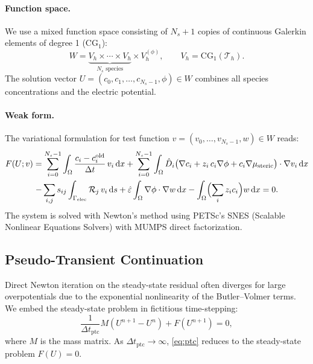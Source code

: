 \documentclass[11pt,a4paper]{article}
\newcommand{\dd}{\mathrm{d}}
\begin{document}
\paragraph{Function space.}
We use a mixed function space consisting of $N_s + 1$ copies of
continuous Galerkin elements of degree 1 (CG$_1$):
\begin{equation}
  W = \underbrace{V_h \times \cdots \times V_h}_{N_s \text{ species}}
    \times V_h^{(\phi)}, \qquad
  V_h = \mathrm{CG}_1(\mathcal{T}_h).
\end{equation}
The solution vector $U = (c_0, c_1, \ldots, c_{N_s-1}, \phi) \in W$
combines all species concentrations and the electric potential.

\paragraph{Weak form.}
The variational formulation for test function $v = (v_0,\ldots,v_{N_s-1},w)
\in W$ reads:
\begin{multline}\label{eq:weak}
  F(U;v) = \sum_{i=0}^{N_s-1} \int_\Omega \frac{c_i - c_i^{\mathrm{old}}}{\Delta t}\, v_i \,\dd x
  + \sum_{i=0}^{N_s-1} \int_\Omega \hat{D}_i \bigl(
    \nabla c_i + z_i\, c_i \nabla\phi + c_i \nabla\mu_{\mathrm{steric}}
  \bigr) \cdot \nabla v_i \,\dd x \\
  - \sum_{i,j} s_{ij} \int_{\Gamma_{\mathrm{elec}}} \mathcal{R}_j \, v_i \,\dd s
  + \hat{\varepsilon} \int_\Omega \nabla\phi \cdot \nabla w \,\dd x
  - \int_\Omega \Bigl(\sum_i z_i c_i\Bigr) w \,\dd x = 0.
\end{multline}
The system is solved with Newton's method using PETSc's SNES
(Scalable Nonlinear Equations Solvers) with MUMPS direct factorization.

\subsection{Pseudo-Transient Continuation}\label{sec:ptc}

Direct Newton iteration on the steady-state residual often diverges for
large overpotentials due to the exponential nonlinearity of the
Butler--Volmer terms. We embed the steady-state problem in fictitious
time-stepping:
\begin{equation}\label{eq:ptc}
  \frac{1}{\Delta t_{\mathrm{ptc}}} M(U^{n+1} - U^n) + F(U^{n+1}) = 0,
\end{equation}
where $M$ is the mass matrix. As $\Delta t_{\mathrm{ptc}} \to \infty$,
\eqref{eq:ptc} reduces to the steady-state problem $F(U) = 0$.
\end{document}
